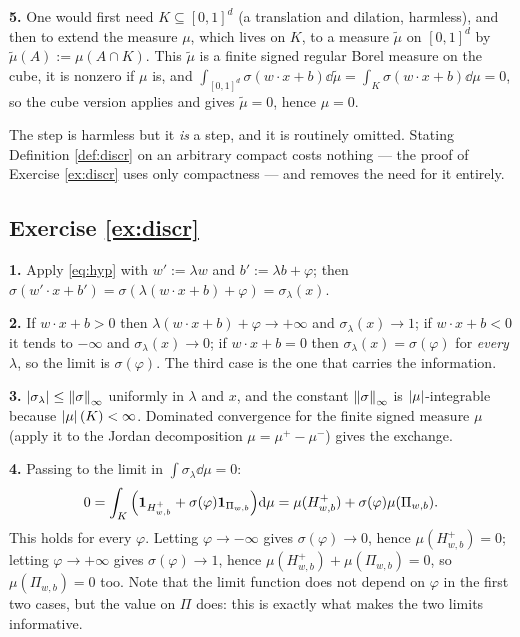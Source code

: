 \documentclass[11pt,a4paper]{article}
\begin{document}
\textbf{5.} One would first need $K\subseteq[0,1]^d$ (a translation and dilation, harmless), and
then to extend the measure $\mu$, which lives on $K$, to a measure $\tilde\mu$ on $[0,1]^d$ by
$\tilde\mu(A) := \mu(A\cap K)$. This $\tilde\mu$ is a finite signed regular Borel measure on the
cube, it is nonzero if $\mu$ is, and
$\int_{[0,1]^d}\sigma(w\cdot x+b)\dd\tilde\mu = \int_K\sigma(w\cdot x+b)\dd\mu = 0$, so the cube
version applies and gives $\tilde\mu = 0$, hence $\mu = 0$.

The step is harmless but it \emph{is} a step, and it is routinely omitted. Stating
Definition \ref{def:discr} on an arbitrary compact costs nothing --- the proof of Exercise
\ref{ex:discr} uses only compactness --- and removes the need for it entirely.

\subsection*{Exercise \ref{ex:discr}}

\textbf{1.} Apply \eqref{eq:hyp} with $w' := \lambda w$ and $b' := \lambda b + \varphi$; then
$\sigma(w'\cdot x + b') = \sigma(\lambda(w\cdot x+b)+\varphi) = \sigma_\lambda(x)$.

\textbf{2.} If $w\cdot x + b > 0$ then $\lambda(w\cdot x+b)+\varphi \to +\infty$ and
$\sigma_\lambda(x)\to 1$; if $w\cdot x + b< 0$ it tends to $-\infty$ and $\sigma_\lambda(x)\to 0$;
if $w\cdot x + b = 0$ then $\sigma_\lambda(x) = \sigma(\varphi)$ for \emph{every} $\lambda$, so the
limit is $\sigma(\varphi)$. The third case is the one that carries the information.

\textbf{3.} $\left\lvert \sigma_\lambda \right\rvert\le\left\lVert \sigma \right\rVert_\infty$ uniformly in $\lambda$ and $x$, and the
constant $\left\lVert \sigma \right\rVert_\infty$ is $\left\lvert \mu \right\rvert$-integrable because $\left\lvert \mu \right\rvert(K)<\infty$. Dominated
convergence for the finite signed measure $\mu$ (apply it to the Jordan decomposition
$\mu = \mu^+-\mu^-$) gives the exchange.

\textbf{4.} Passing to the limit in $\int\sigma_\lambda\dd\mu = 0$:
\[
0 = \int_K \Big(\mathbf{1}_{H^+_{w,b}} + \sigma(\varphi)\mathbf{1}_{\Pi_{w,b}}\Big)\mathrm{d}\mu
= \mu(H^+_{w,b}) + \sigma(\varphi)\mu(\Pi_{w,b}).
\]
This holds for every $\varphi$. Letting $\varphi\to-\infty$ gives $\sigma(\varphi)\to0$, hence
$\mu(H^+_{w,b}) = 0$; letting $\varphi\to+\infty$ gives $\sigma(\varphi)\to1$, hence
$\mu(H^+_{w,b})+\mu(\Pi_{w,b}) = 0$, so $\mu(\Pi_{w,b}) = 0$ too. Note that the limit function does
not depend on $\varphi$ in the first two cases, but the value on $\Pi$ does: this is exactly what
makes the two limits informative.
\end{document}
